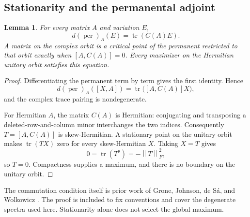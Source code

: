 \documentclass[11pt]{article}
\newcommand{\per}{\operatorname{per}}
\newcommand{\tr}{\operatorname{tr}}
\newcommand{\norm}[1]{\left\lVert#1\right\rVert}
\newtheorem{lemma}[theorem]{Lemma}
\theoremstyle{definition}\newtheorem{definition}[theorem]{Definition}
\theoremstyle{remark}\newtheorem{remark}[theorem]{Remark}
\begin{document}
\subsection{Stationarity and the permanental adjoint}
\begin{lemma}\label{lem:stationary}
For every matrix $A$ and variation $E$,
\[
 d(\per)_A(E)=\tr(C(A)E).
\]
A matrix on the complex orbit is a critical point of the permanent restricted to that orbit exactly when $[A,C(A)]=0$. Every maximizer on the Hermitian unitary orbit satisfies this equation.
\end{lemma}
\begin{proof}
Differentiating the permanent term by term gives the first identity. Hence
\[
 d(\per)_A([X,A])=\tr\bigl([A,C(A)]X\bigr),
\]
and the complex trace pairing is nondegenerate.

For Hermitian $A$, the matrix $C(A)$ is Hermitian: conjugating and transposing a deleted-row-and-column minor interchanges the two indices. Consequently $T=[A,C(A)]$ is skew-Hermitian. A stationary point on the unitary orbit makes $\tr(TX)$ zero for every skew-Hermitian $X$. Taking $X=T$ gives
\[
 0=\tr(T^2)=-\norm{T}_F^2,
\]
so $T=0$. Compactness supplies a maximum, and there is no boundary on the unitary orbit.
\end{proof}
The commutation condition itself is prior work of Grone, Johnson, de S\'a, and Wolkowicz \cite{grone}. The proof is included to fix conventions and cover the degenerate spectra used here. Stationarity alone does not select the global maximum.
\end{document}
